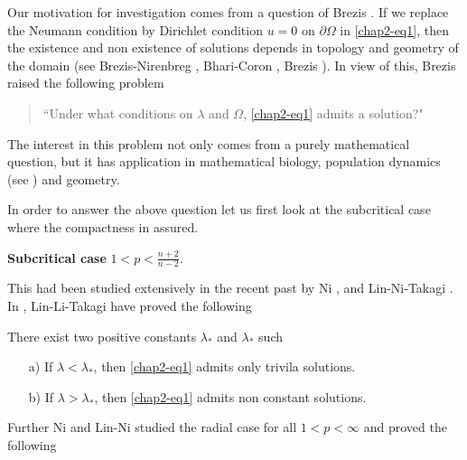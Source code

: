 Our motivation for investigation comes from a question of Brezis \cite{chap2-key11}. If we replace the Neumann condition by Dirichlet condition $u=0$ on $\partial\Omega$ in \eqref{chap2-eq1}, then the existence and non existence of solutions depends in topology and geometry of the domain (see Brezis-Nirenbreg \cite{chap2-key14}, Bhari-Coron \cite{chap2-key9}, Brezis \cite{chap2-key10}). In view of this, Brezis raised the following problem

\begin{quote}
``Under what conditions on $\lambda$ and $\Omega$, \eqref{chap2-eq1} admits a solution?"
\end{quote}

The interest in this problem not only comes from a purely mathematical question, but it has application in mathematical biology, population dynamics (see \cite{chap2-key16}) and geometry.

In order to answer the above question let us first look at the subcritical case where the compactness in assured.

\medskip
\noindent\textbf{Subcritical case }$1 < p < \frac{n+2}{n-2}$. 

\medskip
This had been studied extensively in the recent past by Ni \cite{chap2-key18}, and Lin-Ni-Takagi \cite{chap2-key16}. In \cite{chap2-key16}, Lin-Li-Takagi have proved the following

\begin{theorem}\label{chap2-thm1}
There exist two positive constants $\lambda_{*}$ and $\lambda_{*}$ such
\begin{itemize}
\item[a)] If $\lambda < \lambda_{*}$, then \eqref{chap2-eq1} admits only trivila solutions.
 \item[b)] If $\lambda > \lambda_{*}$, then \eqref{chap2-eq1} admits non constant solutions.
\end{itemize}

Further Ni \cite{chap2-key18} and Lin-Ni \cite{chap2-key15} studied the radial case for all $1< p < \infty$ and proved the following 
\end{theorem}

